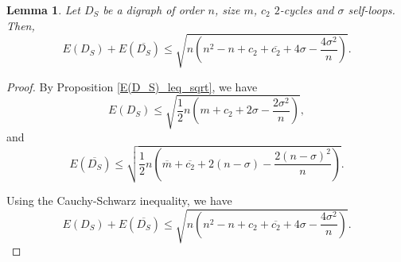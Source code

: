 \documentclass[12pt,a4paper,reqno]{amsart}
\numberwithin{equation}{section}
\theoremstyle{plain}
\newtheorem{lemma}[theorem]{Lemma}
\theoremstyle{definition}
\newcommand{\<}{\langle}
\renewcommand{\>}{\rangle}
\begin{document}
    \begin{lemma}
        Let $D_S$ be a digraph of order $n$, size $m$, $c_2$ $2$-cycles and $\sigma$ self-loops. Then,
        \[ 
        E(D_S)+E(\overline{D_S}) \leq \sqrt{n \left(n^2-n+c_2+\overline{c_2}+4\sigma-\frac{4\sigma^2}{n} \right)  }.
        \]
       
    \end{lemma}

    \begin{proof}
        By Proposition \ref{E(D_S)_leq_sqrt}, we have 
        $$E(D_S)\leq \sqrt{ \frac{1}{2}n \left ( m+c_2+ 2\sigma-\frac{2\sigma^2}{n} \right) },$$
        and 
        $$E(\overline{D_S})\leq \sqrt{ \frac{1}{2}n \left ( \overline{m}+\overline{c_2}+ 2(n-\sigma)-\frac{2(n-\sigma)^2}{n} \right) }.$$

        Using the Cauchy-Schwarz inequality, we have
        \begin{equation*}
            E(D_S)+E(\overline{D_S}) \leq \sqrt{n \left(n^2-n+c_2+\overline{c_2}+4\sigma-\frac{4\sigma^2}{n} \right)  }.
        \end{equation*}
    \end{proof}
\end{document}
